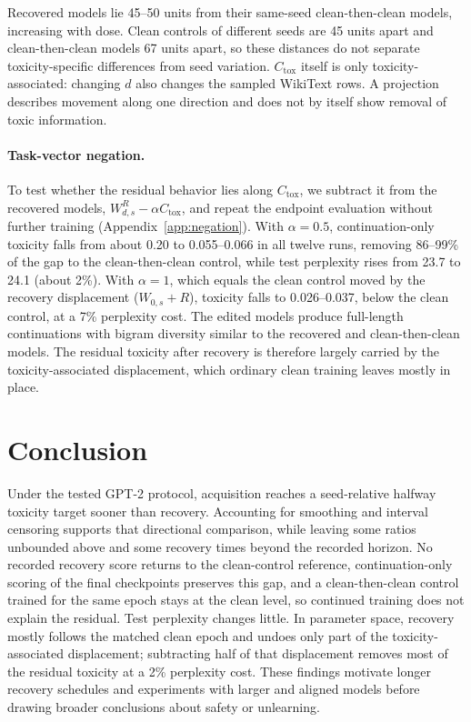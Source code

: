 \documentclass[11pt,a4paper]{article}
\begin{document}
Recovered models lie 45--50 units from their same-seed clean-then-clean models, increasing with dose. Clean controls of different seeds are 45 units apart and clean-then-clean models 67 units apart, so these distances do not separate toxicity-specific differences from seed variation. $C_{\mathrm{tox}}$ itself is only toxicity-associated: changing $d$ also changes the sampled WikiText rows. A projection describes movement along one direction and does not by itself show removal of toxic information.

\paragraph{Task-vector negation.} To test whether the residual behavior lies along $C_{\mathrm{tox}}$, we subtract it from the recovered models, $W^{R}_{d,s}-\alpha C_{\mathrm{tox}}$, and repeat the endpoint evaluation without further training (Appendix~\ref{app:negation}). With $\alpha=0.5$, continuation-only toxicity falls from about 0.20 to 0.055--0.066 in all twelve runs, removing 86--99\% of the gap to the clean-then-clean control, while test perplexity rises from 23.7 to 24.1 (about 2\%). With $\alpha=1$, which equals the clean control moved by the recovery displacement ($W_{0,s}+R$), toxicity falls to 0.026--0.037, below the clean control, at a 7\% perplexity cost. The edited models produce full-length continuations with bigram diversity similar to the recovered and clean-then-clean models. The residual toxicity after recovery is therefore largely carried by the toxicity-associated displacement, which ordinary clean training leaves mostly in place.

\section{Conclusion}
Under the tested GPT-2 protocol, acquisition reaches a seed-relative halfway toxicity target sooner than recovery. Accounting for smoothing and interval censoring supports that directional comparison, while leaving some ratios unbounded above and some recovery times beyond the recorded horizon. No recorded recovery score returns to the clean-control reference, continuation-only scoring of the final checkpoints preserves this gap, and a clean-then-clean control trained for the same epoch stays at the clean level, so continued training does not explain the residual. Test perplexity changes little. In parameter space, recovery mostly follows the matched clean epoch and undoes only part of the toxicity-associated displacement; subtracting half of that displacement removes most of the residual toxicity at a 2\% perplexity cost. These findings motivate longer recovery schedules and experiments with larger and aligned models before drawing broader conclusions about safety or unlearning.
\end{document}

